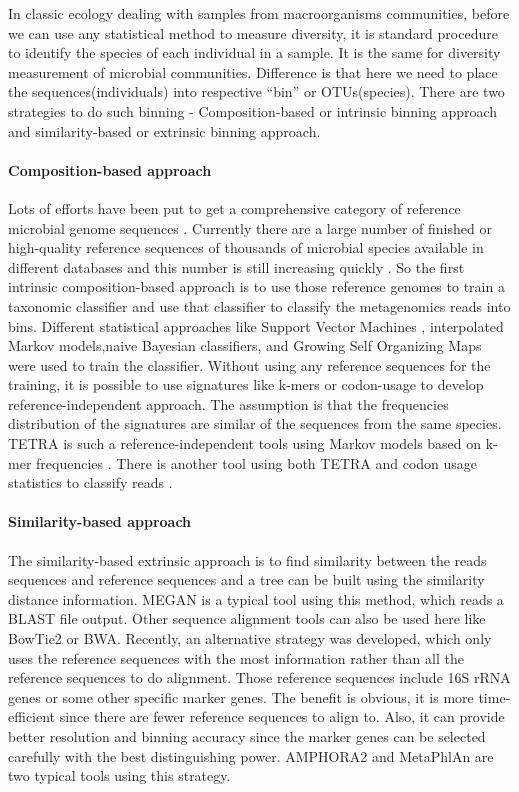 In classic ecology dealing with samples from macroorganisms communities, before
we can use any statistical method to measure diversity, it is standard
procedure to identify the species of each individual in a sample. It is the
same for diversity measurement of microbial communities. Difference is that
here we need to place the sequences(individuals) into respective ``bin'' or
OTUs(species). There are two strategies to do such binning - Composition-based
or intrinsic binning approach and similarity-based or extrinsic binning
approach.

\paragraph{Composition-based approach} Lots of efforts have been put to get a
comprehensive category of reference microbial genome sequences \cite{HMScience,
Wu:2009aa}. Currently there are a large number of finished or high-quality
reference sequences of thousands of microbial species available in different
databases and this number is still increasing quickly \cite{Markowitz:2012aa,
Glass:2010aa, Wang:2007aa}. So the first intrinsic composition-based approach
is to use those reference genomes to train a taxonomic classifier and use that
classifier to classify the metagenomics reads into bins. Different statistical
approaches like Support Vector Machines \cite{Patil:2012aa}, interpolated
Markov models\cite{Brady:2011aa},naive Bayesian classifiers, and Growing Self
Organizing Maps \cite{Rosen:2011aa} were used to train the classifier. Without
using any reference sequences for the training, it is possible to use
signatures like k-mers or codon-usage to develop reference-independent
approach. The assumption is that the frequencies distribution of the signatures
are similar of the sequences from the same species. TETRA is such a
reference-independent tools using Markov models based on k-mer frequencies
\cite{Teeling:2004aa}. There is another tool using both TETRA and codon usage
statistics to classify reads \cite{Tzahor:2009aa}.


\paragraph{Similarity-based approach} The similarity-based extrinsic approach
is to find similarity between the reads sequences and reference sequences and a
tree can be built using the similarity distance information. MEGAN
\cite{Huson:2007aa} is a typical tool using this method, which reads a BLAST
file output. Other sequence alignment tools can also be used here like BowTie2
or BWA. Recently, an alternative strategy was developed, which only uses the
reference sequences with the most information rather than all the reference
sequences to do alignment. Those reference sequences include 16S rRNA genes or
some other specific marker genes. The benefit is obvious, it is more
time-efficient since there are fewer reference sequences to align to. Also, it
can provide better resolution and binning accuracy since the marker genes can
be selected carefully with the best distinguishing power. AMPHORA2
\cite{Wu:2012aa} and MetaPhlAn \cite{Segata:2012aa} are two typical tools using
this strategy.



